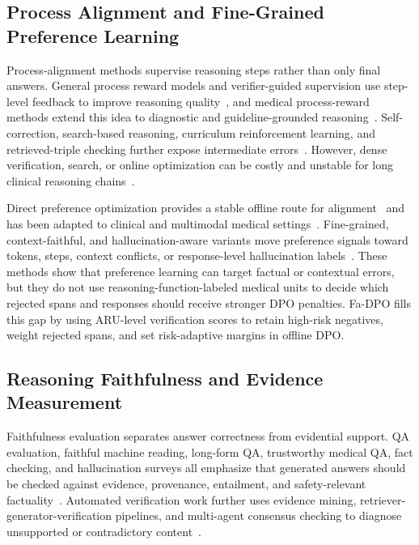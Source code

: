 \documentclass[a4paper,fleqn,doubleblind]{cas-sc}
\begin{document}
\subsection{Process Alignment and Fine-Grained Preference Learning}
Process-alignment methods supervise reasoning steps rather than only final answers.
General process reward models and verifier-guided supervision use step-level feedback to improve reasoning quality~\cite{lightman2024let, wang2024math}, and medical process-reward methods extend this idea to diagnostic and guideline-grounded reasoning~\cite{xu2024reasoningdoctor, chen2025huatuogpto1, wang2025clinicalprm, yun2025medprm}.
Self-correction, search-based reasoning, curriculum reinforcement learning, and retrieved-triple checking further expose intermediate errors~\cite{yang2025medrefl, zhong2026p2s, sun2025reasonmed, jiang2026meds3, ipm2026srcr, ipm2026s2cr}.
However, dense verification, search, or online optimization can be costly and unstable for long clinical reasoning chains~\cite{zhou2022rainier, casper2023open}.

Direct preference optimization provides a stable offline route for alignment~\cite{rafailov2023direct, meng2024simpo} and has been adapted to clinical and multimodal medical settings~\cite{savage2025finetuning, zhu2025mmedpo}.
Fine-grained, context-faithful, and hallucination-aware variants move preference signals toward tokens, steps, context conflicts, or response-level hallucination labels~\cite{gu2025maskdpo, zhou2025treg, yang2025sepo, xu2025fullstepdpo, bi2025contextdpo, zhao2024hadpo}.
These methods show that preference learning can target factual or contextual errors, but they do not use reasoning-function-labeled medical units to decide which rejected spans and responses should receive stronger DPO penalties.
Fa-DPO fills this gap by using ARU-level verification scores to retain high-risk negatives, weight rejected spans, and set risk-adaptive margins in offline DPO.

\subsection{Reasoning Faithfulness and Evidence Measurement}
Faithfulness evaluation separates answer correctness from evidential support.
QA evaluation, faithful machine reading, long-form QA, trustworthy medical QA, fact checking, and hallucination surveys all emphasize that generated answers should be checked against evidence, provenance, entailment, and safety-relevant factuality~\cite{adlakha2024evaluating, li2025mdmqa, xiao2025longformqa, wang2025trustworthy, das2023factchecking, huang2025surveyhallucination}.
Automated verification work further uses evidence mining, retriever-generator-verification pipelines, and multi-agent consensus checking to diagnose unsupported or contradictory content~\cite{ipm2025rgv, ipm2025delphiagent}.
\end{document}
